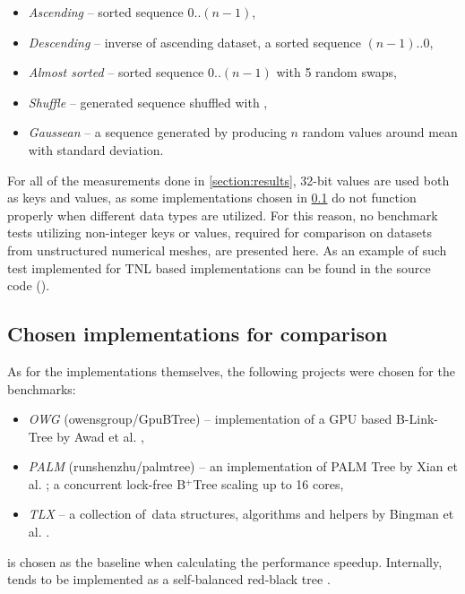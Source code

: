 \begin{itemize}
  \item \textit{Ascending} -- sorted sequence $0..(n-1)$,
  \item \textit{Descending} -- inverse of ascending dataset, a sorted sequence $(n-1)..0$,
  \item \textit{Almost sorted} -- sorted sequence $0..(n-1)$ with 5 random swaps,
  \item \textit{Shuffle} -- generated sequence shuffled with ,
  \item \textit{Gaussean} -- a sequence generated by producing $n$ random values around mean with standard deviation.
\end{itemize}

For all of the measurements done in \cref{section:results}, 32-bit values are used both as keys and values, as some implementations chosen in \cref{subsection:benchmark:implementations} do not function properly when different data types are utilized. For this reason, no benchmark tests utilizing non-integer keys or values, required for comparison on datasets from unstructured numerical meshes, are presented here. As an example of such test implemented for TNL based implementations can be found in the source code ().

\subsection{Chosen implementations for comparison}\label{subsection:benchmark:implementations}

As for the implementations themselves, the following projects were chosen for the benchmarks:

\begin{itemize}
  \item \textit{OWG} (owensgroup/GpuBTree) -- implementation of a GPU based B-Link-Tree by Awad et al. \cite{awad},
  \item \textit{PALM} (runshenzhu/palmtree) -- an implementation of PALM Tree \cite{palm} by Xian et al. \cite{palm-impl}; a concurrent lock-free B$^+$Tree scaling up to 16 cores,
  \item \textit{TLX} -- a collection of \CC\,data structures, algorithms and helpers by Bingman et al. \cite{TLX}.
\end{itemize}

 is chosen as the baseline when calculating the performance speedup. Internally,  tends to be implemented as a self-balanced red-black tree \cite{cppreference-map}.

